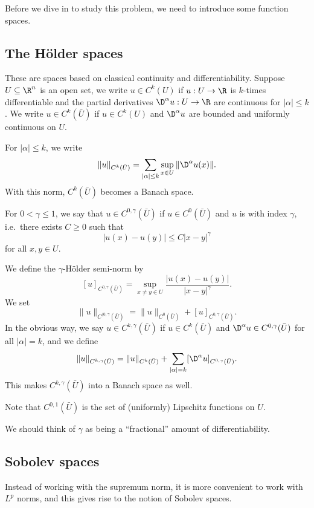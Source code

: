 \documentclass[a4paper]{article}
\begin{document}
Before we dive in to study this problem, we need to introduce some function spaces.

\subsection{The \texorpdfstring{H\"older}{Holder} spaces}
These are spaces based on classical continuity and differentiability. Suppose $U \subseteq \R^n$ is an open set, we write $u \in C^k(U)$ if $u: U \to \R$ is $k$-times differentiable and the partial derivatives $\D^\alpha u : U \to \R$ are continuous for $|\alpha| \leq k$. We write $u \in C^k(\bar{U})$ if $u \in C^k(U)$ and $\D^\alpha u$ are bounded and uniformly continuous on $U$.

For $|\alpha| \leq k$, we write
\[
  \|u\|_{C^k(\bar{U})} = \sum_{|\alpha| \leq k} \sup_{x \in U} \|\D^\alpha u(x)\|.
\]
With this norm, $C^k(\bar{U})$ becomes a Banach space.

For $0 < \gamma \leq 1$, we say that $u \in C^{0, \gamma}(\bar{U})$ if $u \in C^0(\bar{U})$ and $u$ is  with index $\gamma$, i.e.\ there exists $C \geq 0$ such that
\[
  |u(x) - u(y)| \leq C|x - y|^\gamma
\]
for all $x, y \in U$.

We define the $\gamma$-H\"older semi-norm by
\[
  [u]_{C^{0, \gamma}(\bar{U})} = \sup_{x\not= y \in U} \frac{|u(x) - u(y)|}{|x - y|^\gamma}.
\]
We set
\[
  \|u\|_{C^{(0, \gamma}(\bar{U})} = \|u\|_{C^0(\bar{U})} + [u]_{C^{0, \gamma}(\bar{U})}.
\]
In the obvious way, we say $u \in C^{k, \gamma}(\bar{U})$ if $u \in C^k(\bar{U})$ and $\D^\alpha u \in C^{0, \gamma}(\bar{U})$ for all $|\alpha| = k$, and we define
\[
  \|u\|_{C^{k, \gamma}(\bar{U})} = \|u\|_{C^k(\bar{U})} + \sum_{|\alpha| = k} [\D^\alpha u]_{C^{0, \gamma}(\bar{U})}.
\]
This makes $C^{k, \gamma}(\bar{U})$ into a Banach space as well.

Note that $C^{0, 1}(\bar{U})$ is the set of (uniformly) Lipschitz functions on $U$.

We should think of $\gamma$ as being a ``fractional'' amount of differentiability.

\subsection{Sobolev spaces}
Instead of working with the supremum norm, it is more convenient to work with $L^p$ norms, and this gives rise to the notion of Sobolev spaces.
\end{document}
